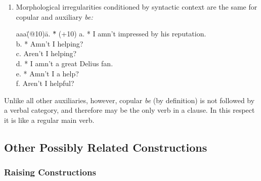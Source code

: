 \begin{enumerate}
\item Morphological irregularities conditioned by syntactic context are
the same for copular and auxiliary {\em be:}
\begin{tabbing}
aaa\=(@10)\= a. \= *\= \kill
   \>(+10)\> a. \> *\> I amn't impressed by his reputation. \\
   \>    \>  b. \> *\> Amn't I helping? \\
   \>    \>  c. \>  \> Aren't I helping? \\
   \>    \>  d. \> *\> I amn't a great Delius fan. \\
   \>    \>  e. \> *\> Amn't I a help? \\
   \>    \>  f. \>  \> Aren't I helpful?
\end{tabbing}

\end{enumerate}

Unlike all other auxiliaries, however, copular {\em be} (by definition)
is not followed by a verbal category, and therefore may be the only verb
in a clause.  In this respect it is like a regular main verb.

\subsection{Other Possibly Related Constructions}

\label{other}

\subsubsection{Raising Constructions}

